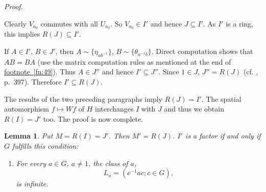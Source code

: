 \documentclass[b5paper,twoside]{article}
\theoremstyle{mvnplain}
\newtheorem{lemma}{Lemma}[section]
\renewenvironment{proof}[1][Proof]{%
  \par\addvspace{0.35\baselineskip}%
  \noindent\textit{#1.}\ \normalfont\ignorespaces
}{%
  \par\addvspace{0.35\baselineskip}%
}
\newcommand{\M}{\mathbf M}
\newcommand{\R}{\mathbf R}
\newcommand{\Hilbert}{\mathfrak H}
\def\M{M}%
\def\R{R}%
\def\Hilbert{H}%
\def\mathfrak#1{#1}%
\begin{document}
\begin{proof}
Clearly \(V_{a_0}\) commutes with all \(U_{a_0}\). So \(V_{a_0}\in I'\)
and hence \(J\subseteq I'\). As \(I'\) is a ring, this implies
\(\R(J)\subseteq I'\).

If \(A\in I'\), \(B\in J'\), then
\(A\sim\{\eta_{ab^{-1}}\}\), \(B\sim\{\theta_{a^{-1}b}\}\). Direct
computation shows that \(AB=BA\) (use the matrix computation rules as
mentioned at the end of \hyperref[fn:49]{footnote~\ref*{fn:49}}). Thus
\(A\in J''\) and hence
\(I'\subseteq J''\). Since \(1\in J\), \(J''=\R(J)\) (cf.
\cite{ref2}, p.~397). Therefore \(I'\subseteq\R(J)\).

The results of the two preceding paragraphs imply \(\R(J)=I'\). The spatial
automorphism \(f\mapsto Wf\) of \(\Hilbert\) interchanges \(I\) with \(J\)
and thus we obtain \(\R(I)=J'\) too. The proof is now complete.
\end{proof}

\begin{lemma}\label{lem:5.3.4}
Put \(\M=\R(I)=J'\). Then \(\M'=\R(J)\). \(I'\) is a factor if and only if
\(\mathfrak G\) fulfills this condition:
\begin{enumerate}[label=(\roman*)]
\item For every \(a\in\mathfrak G\), \(a\ne1\), the class of \(a\),
\[
 \mathfrak L_a=(c^{-1}ac;c\in\mathfrak G),
\]
is infinite.
\end{enumerate}
\end{lemma}
\end{document}
